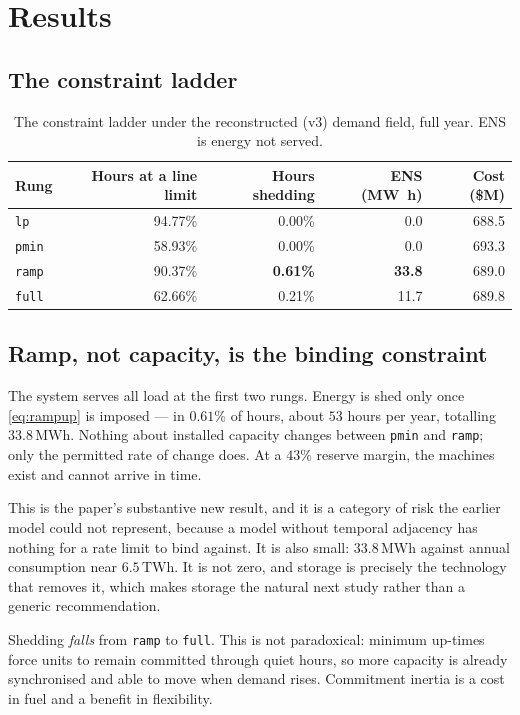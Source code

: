 \documentclass[11pt,a4paper]{article}
\theoremstyle{definition}
\theoremstyle{plain}
\theoremstyle{remark}
\newcommand{\MWh}{\,\mathrm{MWh}}
\begin{document}
\section{Results}
\label{sec:results}

\subsection{The constraint ladder}

\begin{table}[htbp]
\centering
\caption{The constraint ladder under the reconstructed (v3) demand field, full
year. ENS is energy not served.}
\label{tab:ladder}
\small
\begin{tabular}{lrrrr}
\toprule
Rung & Hours at a line limit & Hours shedding & ENS (\si{\mega\watt\hour}) & Cost (\$M) \\
\midrule
\texttt{lp}   & 94.77\% & 0.00\% & 0.0  & 688.5 \\
\texttt{pmin} & 58.93\% & 0.00\% & 0.0  & 693.3 \\
\texttt{ramp} & 90.37\% & \textbf{0.61\%} & \textbf{33.8} & 689.0 \\
\texttt{full} & 62.66\% & 0.21\% & 11.7 & 689.8 \\
\bottomrule
\end{tabular}
\end{table}

\subsection{Ramp, not capacity, is the binding constraint}

The system serves all load at the first two rungs. Energy is shed only once
\eqref{eq:rampup} is imposed --- in $0.61\%$ of hours, about $53$ hours per
year, totalling $33.8\MWh$. Nothing about installed capacity changes between
\texttt{pmin} and \texttt{ramp}; only the permitted rate of change does. At a
$43\%$ reserve margin, the machines exist and cannot arrive in time.

This is the paper's substantive new result, and it is a category of risk the
earlier model could not represent, because a model without temporal adjacency
has nothing for a rate limit to bind against. It is also small: $33.8\MWh$
against annual consumption near $6.5\,\mathrm{TWh}$. It is not zero, and
storage is precisely the technology that removes it, which makes storage the
natural next study rather than a generic recommendation.

Shedding \emph{falls} from \texttt{ramp} to \texttt{full}. This is not
paradoxical: minimum up-times force units to remain committed through quiet
hours, so more capacity is already synchronised and able to move when demand
rises. Commitment inertia is a cost in fuel and a benefit in flexibility.
\end{document}
